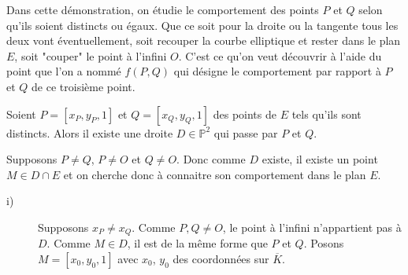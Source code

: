 Dans cette démonstration, on étudie le comportement des points $P$ et $Q$ selon qu'ils soient distincts ou égaux. Que ce soit pour la droite ou la tangente tous les deux vont éventuellement, soit
recouper la courbe elliptique et rester dans le plan $E$, soit "couper" le point à l'infini  $O$. C'est ce qu'on veut découvrir à l'aide du point que l'on a nommé $f(P,Q)$ qui désigne le comportement
par rapport à $P$ et $Q$ de ce troisième point.

\begin{demonstration}
    \begin{description}
        Soient $P = \left[ x_{P}, y_{P}, 1 \right]$ et $Q = \left[ x_{Q}, y_{Q}, 1 \right]$ des points de $E$ tels qu'ils sont distincts. Alors il existe une droite $D \in \mathbb{P} ^2$ qui passe par $P$ et $Q$.
        \item[1)] Supposons $P \neq Q$, $P \neq O$ et $Q \neq O$. Donc comme $D$ existe, il existe un point $M \in D \cap E$ et on cherche donc à connaitre son comportement dans le plan $E$.
            \begin{description}
        \item[i)] Supposons $x_{P} \neq x_{Q}$. 
            Comme $P,Q \neq O$, le point à l'infini n'appartient pas à $D$. Comme $M \in D$, il est de la même forme que $P$ et $Q$.
            Posons $M = \left[ x_0, y_0, 1 \right]$ avec $x_0$, $y_0$ des coordonnées sur $\overline{K}$.


\end{description}
\end{description}
\end{demonstration}
